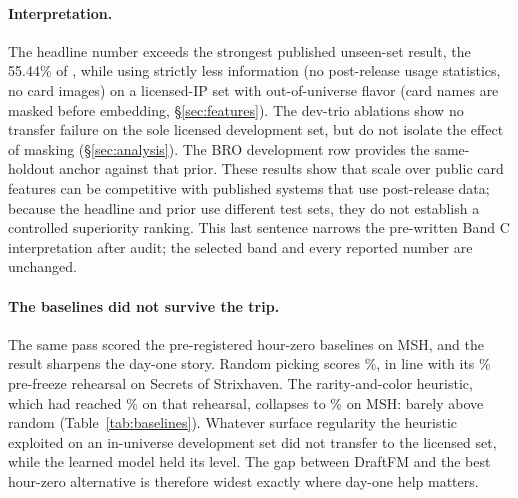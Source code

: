 \paragraph{Interpretation.}
The headline number exceeds the strongest published unseen-set result,
the 55.44\% of \citet{bertram2024cards}, while using strictly less
information (no post-release usage statistics, no card images) on a
licensed-IP set with out-of-universe flavor (card names are masked
before embedding, \S\ref{sec:features}). The dev-trio ablations show no
transfer failure on the sole licensed development set, but do not isolate
the effect of masking (\S\ref{sec:analysis}). The BRO development row provides the
same-holdout anchor against that prior. These results show that scale over
public card features can be competitive with published systems that use
post-release data; because the headline and prior use different test sets,
they do not establish a controlled superiority ranking. This last sentence
narrows the pre-written Band C interpretation after audit; the selected
band and every reported number are unchanged.

\paragraph{The baselines did not survive the trip.}
The same pass scored the pre-registered hour-zero baselines on MSH, and
the result sharpens the day-one story. Random picking scores
\BaseRandomMsh\%, in line with its \BaseRandom\% pre-freeze rehearsal on
Secrets of Strixhaven. The rarity-and-color heuristic, which had reached
\BaseRarity\% on that rehearsal, collapses to \BaseRarityMsh\% on MSH:
barely above random (Table~\ref{tab:baselines}). Whatever surface
regularity the heuristic exploited on an in-universe development set did
not transfer to the licensed set, while the learned model held its
level. The gap between DraftFM and the best hour-zero alternative is
therefore widest exactly where day-one help matters.

